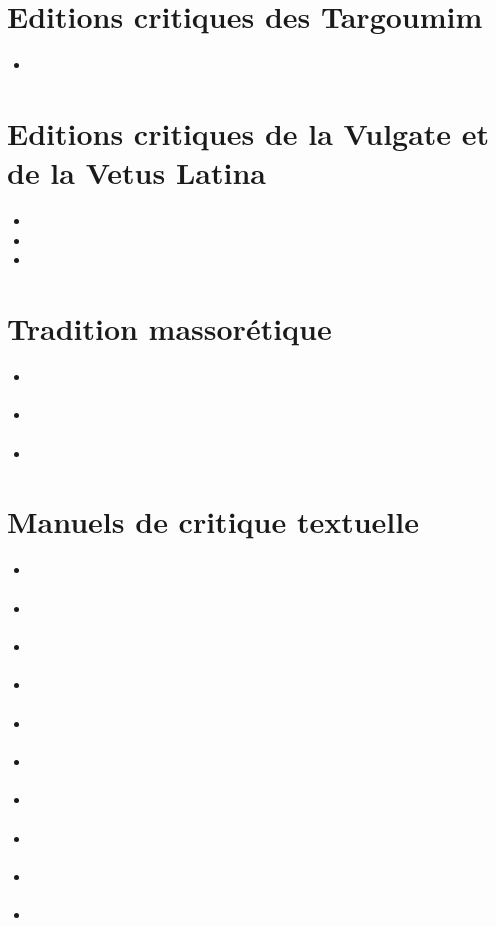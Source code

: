 \documentclass[11pt,a4paper]{article}
\begin{document}
\section{Editions critiques des Targoumim}
    \begin{itemize}
        \item {}
    \end{itemize}
\section{Editions critiques de la Vulgate et de la Vetus Latina}
    \begin{itemize}
        \item {}
        \item {}
        \item 
    \end{itemize}

\section{Tradition massorétique}
\begin{itemize}
    \item \cite{ginsburg_introduction_1897}
    \item \cite{weil_massorah_1971}
    \item \cite{yeivin_introduction_1980}
\end{itemize}

\section{Manuels de critique textuelle}
\begin{itemize}
    \item \cite{tov_textual_2012}
    \item \cite{waard_biblia_2020}
    \item \cite{romer_guide_2006}
    \item \cite{brotzman_old_2016}
    \item \cite{payne_old_1974}
    \item \cite{barthelemy_critique_1982}
    \item \cite{barthelemy_critique_1986}
    \item \cite{barthelemy_critique_1992}
    \item \cite{barthelemy_critique_2005}
    \item \cite{barthelemy_critique_2015}
\end{itemize}
\end{document}

